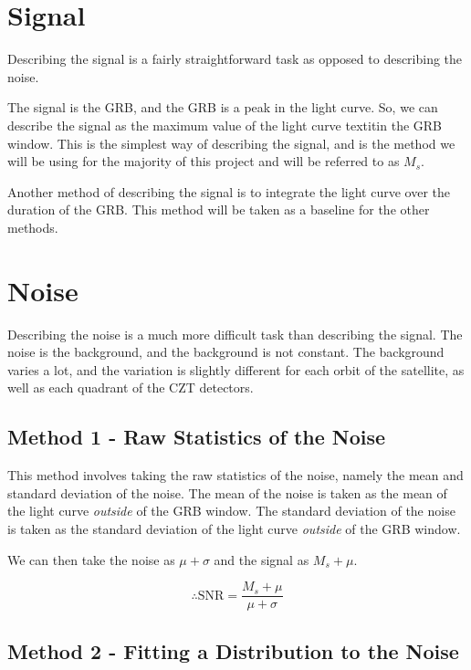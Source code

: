\documentclass[11pt]{book} %
\begin{document}
\newpage

\section{Signal}

Describing the signal is a fairly straightforward task as opposed to describing the noise.

The signal is the GRB, and the GRB is a peak in the light curve. So, we can describe the signal as the maximum value of the light curve textit{in the GRB window}. This is the simplest way of describing the signal, and is the method we will be using for the majority of this project and will be referred to as \textbf{$M_s$}.

Another method of describing the signal is to integrate the light curve over the duration of the GRB. This method will be taken as a baseline for the other methods.

\section{Noise}

Describing the noise is a much more difficult task than describing the signal. The noise is the background, and the background is not constant. The background varies a lot, and the variation is slightly different for each orbit of the satellite, as well as each quadrant of the CZT detectors.

\subsection{Method 1 - Raw Statistics of the Noise}

This method involves taking the raw statistics of the noise, namely the mean and standard deviation of the noise. The mean of the noise is taken as the mean of the light curve \textit{outside} of the GRB window. The standard deviation of the noise is taken as the standard deviation of the light curve \textit{outside} of the GRB window.

We can then take the noise as $\mu+\sigma$ and the signal as $M_s+\mu$. 

\begin{equation}
    \therefore \text{SNR} = \frac{M_s+\mu}{\mu+\sigma}
\end{equation}

\subsection{Method 2 - Fitting a Distribution to the Noise} \label{sec:method2}
\end{document}
